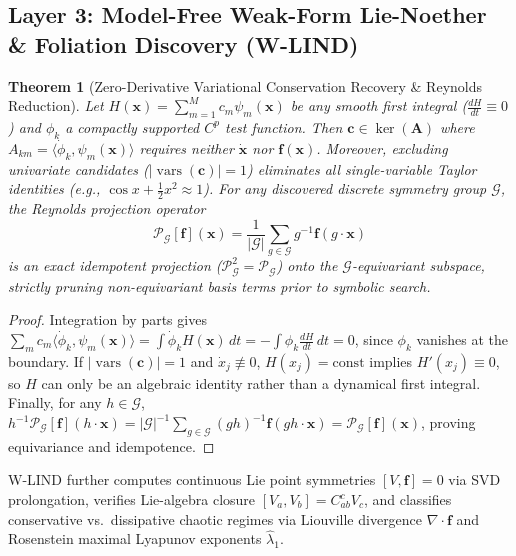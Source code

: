 \documentclass[11pt,a4paper]{article}
\newtheorem{theorem}{Theorem}
\begin{document}
\subsection{Layer 3: Model-Free Weak-Form Lie-Noether \& Foliation Discovery (W-LIND)}
\begin{theorem}[Zero-Derivative Variational Conservation Recovery \& Reynolds Reduction]
\label{thm:wlind}
Let $H(\mathbf{x}) = \sum_{m=1}^M c_m \psi_m(\mathbf{x})$ be any smooth first integral ($\frac{dH}{dt}\equiv 0$) and $\phi_k$ a compactly supported $C^p$ test function. Then $\mathbf{c} \in \ker(\mathbf{A})$ where $A_{km} = \langle \dot{\phi}_k, \psi_m(\mathbf{x}) \rangle$ requires neither $\dot{\mathbf{x}}$ nor $\mathbf{f}(\mathbf{x})$. Moreover, excluding univariate candidates ($|\operatorname{vars}(\mathbf{c})| = 1$) eliminates all single-variable Taylor identities (e.g., $\cos x + \frac{1}{2}x^2 \approx 1$). For any discovered discrete symmetry group $\mathcal{G}$, the Reynolds projection operator
\begin{equation}
  \mathcal{P}_{\mathcal{G}}[\mathbf{f}](\mathbf{x}) = \frac{1}{|\mathcal{G}|}\sum_{g \in \mathcal{G}} g^{-1} \mathbf{f}(g\cdot\mathbf{x})
\end{equation}
is an exact idempotent projection ($\mathcal{P}_{\mathcal{G}}^2 = \mathcal{P}_{\mathcal{G}}$) onto the $\mathcal{G}$-equivariant subspace, strictly pruning non-equivariant basis terms prior to symbolic search.
\end{theorem}
\begin{proof}
Integration by parts gives $\sum_m c_m \langle \dot{\phi}_k, \psi_m(\mathbf{x})\rangle = \int \dot{\phi}_k H(\mathbf{x})\,dt = -\int \phi_k \frac{dH}{dt}\,dt = 0$, since $\phi_k$ vanishes at the boundary. If $|\operatorname{vars}(\mathbf{c})|=1$ and $\dot{x}_j \not\equiv 0$, $H(x_j)=\text{const}$ implies $H'(x_j)\equiv 0$, so $H$ can only be an algebraic identity rather than a dynamical first integral. Finally, for any $h \in \mathcal{G}$, $h^{-1}\mathcal{P}_{\mathcal{G}}[\mathbf{f}](h\cdot\mathbf{x}) = |\mathcal{G}|^{-1}\sum_{g\in\mathcal{G}} (gh)^{-1}\mathbf{f}(gh\cdot\mathbf{x}) = \mathcal{P}_{\mathcal{G}}[\mathbf{f}](\mathbf{x})$, proving equivariance and idempotence.
\end{proof}

W-LIND further computes continuous Lie point symmetries $[V, \mathbf{f}]=0$ via SVD prolongation, verifies Lie-algebra closure $[V_a, V_b] = C_{ab}^c V_c$, and classifies conservative vs.\ dissipative chaotic regimes via Liouville divergence $\nabla\cdot\mathbf{f}$ and Rosenstein maximal Lyapunov exponents $\hat{\lambda}_1$.
\end{document}
